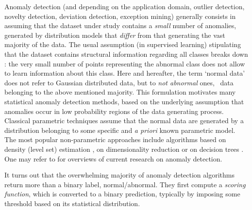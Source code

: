 Anomaly detection (and depending on the application domain, outlier detection, novelty detection, deviation detection, exception mining) generally consists in assuming that the dataset under study contains a \textit{small} number of anomalies, generated by distribution models that  \textit{differ} from that generating the vast majority of the data.
%
The usual assumption (in supervised learning) stipulating that the dataset contains structural information regarding all classes breaks down \citep{Roberts99}: %
the very small number of points representing the abnormal class does not allow to learn information about this class. Here and hereafter, the term `normal data' does not refer to Gaussian distributed data, but  to  \emph{not abnormal} ones, \ie~data belonging to the above mentioned majority. 
This formulation motivates many statistical anomaly detection methods, based on the underlying assumption that anomalies occur in low probability regions of the data generating process. 
Classical parametric techniques \citep{Barnett94, Eskin2000} assume that the normal data are generated by a distribution belonging to some  specific and \emph{a priori} known parametric model.  
The most popular non-parametric approaches include algorithms based on density (level set) estimation \citep{Scholkopf2001, Scott2006, Breunig2000LOF}, on dimensionality reduction \citep{Shyu2003, Aggarwal2001} or on decision trees \citep{Liu2008}.
One may refer to \cite{Hodge2004survey, Chandola2009survey, Patcha2007survey, Markou2003survey} for overviews of current research on anomaly detection.

It turns out that the overwhelming majority of anomaly detection algorithms return more than a binary label, normal/abnormal. They first compute a \emph{scoring function}, which is converted to a binary prediction, typically by imposing some threshold based on its statistical distribution.

